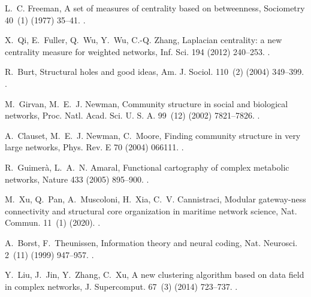 \documentclass[preprint,3p,times,sort&compress]{elsarticle}
\begin{document}
\begin{thebibliography}{10}
L.~C. Freeman, {A set of measures of centrality based on betweenness},
  Sociometry 40~(1) (1977) 35--41.
\newblock \href {https://doi.org/10.2307/3033543} {}.

X.~Qi, E.~Fuller, Q.~Wu, Y.~Wu, C.-Q. Zhang, Laplacian centrality: a new
  centrality measure for weighted networks, Inf. Sci. 194 (2012) 240--253.
\newblock \href {https://doi.org/10.1016/j.ins.2011.12.027}
  {}.

R.~Burt, Structural holes and good ideas, Am. J. Sociol. 110~(2) (2004)
  349--399.
\newblock \href {https://doi.org/10.1086/421787} {}.

M.~Girvan, M.~E.~J. Newman, Community structure in social and biological
  networks, Proc. Natl. Acad. Sci. U. S. A. 99~(12) (2002) 7821--7826.
\newblock \href {https://doi.org/10.1073/pnas.122653799}
  {}.

A.~Clauset, M.~E.~J. Newman, C.~Moore, {Finding community structure in very
  large networks}, Phys. Rev. E 70 (2004) 066111.
\newblock \href {https://doi.org/10.1103/physreve.70.066111}
  {}.

R.~Guimer{\`a}, L.~A.~N. Amaral, Functional cartography of complex metabolic
  networks, Nature 433 (2005) 895--900.
\newblock \href {https://doi.org/10.1038/nature03288}
  {}.

M.~Xu, Q.~Pan, A.~Muscoloni, H.~Xia, C.~V. Cannistraci, Modular gateway-{ness}
  connectivity and structural core organization in maritime network science,
  Nat. Commun. 11~(1) (2020).
\newblock \href {https://doi.org/10.1038/s41467-020-16619-5}
  {}.

A.~Borst, F.~Theunissen, Information theory and neural coding, Nat. Neurosci.
  2~(11) (1999) 947--957.
\newblock \href {https://doi.org/10.1038/14731} {}.

Y.~Liu, J.~Jin, Y.~Zhang, C.~Xu, A new clustering algorithm based on data field
  in complex networks, J. Supercomput. 67~(3) (2014) 723--737.
\newblock \href {https://doi.org/10.1007/s11227-013-0984-x}
  {}.


\end{thebibliography}
\end{document}
